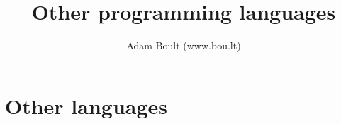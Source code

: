 \documentclass[oneside]{book}
\begin{document}
\author{Adam Boult (www.bou.lt)}
\title{Other programming languages}
\maketitle

\setcounter{tocdepth}{0}
\tableofcontents



\part{Other languages}



\end{document}
